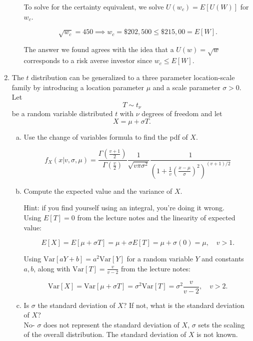 \documentclass[letterpaper,12pt,fleqn]{article}
\begin{document}
\begin{enumerate}
\begin{enumerate}[a)]
To solve for the certainty equivalent, we solve $U(w_c) = E[U(W)]$ for $w_c$.

$$ \sqrt{w_c} = 450 \implies w_c = \$ 202,500 \leq \$215,00 = E[W].$$

The answer we found agrees with the idea that a $U(w) = \sqrt{w}$ corresponds to a risk averse investor since $w_c \leq E[W]$.
\end{enumerate}


\newpage

\item The $t$ distribution can be generalized to a three parameter location-scale family by introducing a location parameter $\mu$ and a scale parameter $\sigma > 0$.  Let
\begin{equation*}
T \sim t_{\nu}
\end{equation*}
be a random variable distributed $t$ with $\nu$ degrees of freedom and let
\begin{equation*}
X = \mu + \sigma T.
\end{equation*}

\begin{enumerate}[a)]
\item Use the change of variables formula to find the pdf of $X$.

$$f_X(x|v,\sigma,\mu) = \frac{\Gamma(\frac{v+1}{2})}{\Gamma(\frac{v}{2})}\frac{1}{\sqrt{v\pi \sigma^2}}\frac{1}{(1+\frac{1}{v}(\frac{x-\mu}{\sigma})^2)^{(v+1)/2}}$$

\item Compute the expected value and the variance of $X$.

Hint: if you find yourself using an integral, you're doing it wrong. \\

Using $E[T] = 0$ from the lecture notes and the linearity of expected value:

$$E[X] = E[\mu + \sigma T] = \mu + \sigma E[T] = \mu + \sigma (0) = \mu, \quad v > 1.$$

Using $\text{Var}[aY+b] = a^2\text{Var}[Y]$ for a random variable $Y$ and constants $a,b$, along with $\text{Var}[T] = \frac{v}{v-2}$ from the lecture notes:

$$\text{Var}[X] = \text{Var}[\mu + \sigma T] = \sigma^2\text{Var}[T] = \sigma^2 \frac{v}{v-2}, \quad v >2.$$
\item Is $\sigma$ the standard deviation of $X$?  If not, what is the standard deviation of $X$?\\

No- $\sigma$ does not represent the standard deviation of $X$, $\sigma$ sets the scaling of the overall distribution. The standard deviation of $X$ is not known.
\end{enumerate}



\end{enumerate}
\end{document}
